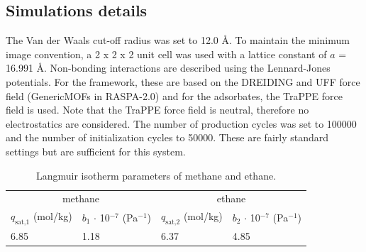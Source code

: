 \documentclass{article}
\begin{document}
\subsection{Simulations details} 
The Van der Waals cut-off radius was set to 12.0 \AA. To maintain the minimum image convention, a 2 x 2 x 2 unit cell was used with a lattice constant of $a$ = 16.991 \AA. Non-bonding interactions are described using the Lennard-Jones potentials. For the framework, these are based on the DREIDING and UFF force field (GenericMOFs in RASPA-2.0) and for the adsorbates, the TraPPE force field is used. Note that the TraPPE force field is neutral, therefore no electrostatics are considered. The number of production cycles was set to 100000 and the number of initialization cycles to 50000. These are fairly standard settings but are sufficient for this system.  


\begin{table}[h!]
\centering
\caption{Langmuir isotherm parameters of methane and ethane.}
\label{tab:isotherm_parameters}
\begin{tabular}{l l l l}
\toprule
\multicolumn{2}{c}{methane} & \multicolumn{2}{c}{ethane}\\
$q_\text{sat,1}$ (mol/kg) & $b_1$ $\cdot$ 10$^{-7}$ (Pa$^{-1}$) & $q_\text{sat,2}$ (mol/kg) & $b_2$  $\cdot$ 10$^{-7}$ (Pa$^{-1}$) \\
\midrule
6.85 & 1.18 & 6.37 & 4.85 \\
\bottomrule
\end{tabular}
\end{table}






\end{document}
